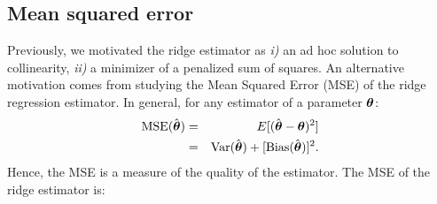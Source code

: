 \documentclass[a4paper]{article}
\theoremstyle{myexamplestyle}
\newcommand{\ttheta}{\mbox{\boldmath $\theta$}}
\begin{document}
\subsection{Mean squared error}
Previously, we motivated the ridge estimator as \textit{i)} an ad hoc solution to collinearity, \textit{ii)} a minimizer of a penalized sum of squares. An alternative motivation comes from studying the Mean Squared Error (MSE) of the ridge regression estimator. In general, for any estimator of a parameter $\ttheta$:
\begin{eqnarray*}
\mbox{MSE}( \hat{\ttheta} ) & = & E [ ( \hat{\ttheta} - \ttheta)^2 ]
\\
& = & \mbox{Var}( \hat{ \ttheta} ) + [\mbox{Bias} ( \hat{\ttheta} )]^2.
\end{eqnarray*}
Hence, the MSE is a measure of the quality of the estimator. The MSE of the ridge estimator is:
\end{document}
